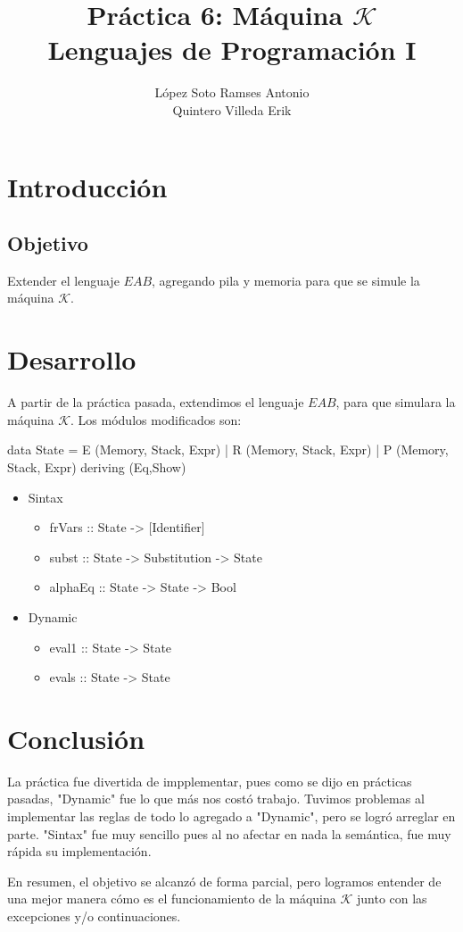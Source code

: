 \documentclass[12pt, letterpaper]{article}
\title{Práctica 6: Máquina $\mathcal{K}$ \\
       {\small Lenguajes de Programación I}}
\author{López Soto Ramses Antonio \\
        Quintero Villeda Erik}
\begin{document}
    \maketitle

    \section*{Introducción}

     \subsection*{Objetivo}
        Extender el lenguaje $EAB$, agregando pila y memoria para que se simule la máquina $\mathcal{K}$.

    \section*{Desarrollo}
    A partir de la práctica pasada, extendimos el lenguaje $EAB$, para que simulara la máquina $\mathcal{K}$.
    Los módulos modificados son:

    \begin{center}
        data State = E (Memory, Stack, Expr) | R (Memory, Stack, Expr) | P (Memory, Stack, Expr) deriving (Eq,Show)
    \end{center}

    \begin{itemize}
        \item Sintax
            \begin{itemize}
                \item frVars :: State -> [Identifier]
                \item subst :: State -> Substitution -> State
                \item alphaEq :: State -> State -> Bool
            \end{itemize}

        \item Dynamic
            \begin{itemize}
                \item eval1 :: State -> State
                \item evals :: State -> State
            \end{itemize}
    \end{itemize}

    \section*{Conclusión}
    La práctica fue divertida de impplementar, pues como se dijo en prácticas pasadas, "Dynamic" 
    fue lo que más nos costó trabajo. Tuvimos problemas al implementar las reglas de todo lo
    agregado a "Dynamic", pero se logró arreglar en parte. "Sintax" fue muy sencillo pues al no
    afectar en nada la semántica, fue muy rápida su implementación. \vspace{.3cm}

    En resumen, el objetivo se alcanzó de forma parcial, pero logramos entender de una mejor manera
    cómo es el funcionamiento de la máquina $\mathcal{K}$ junto con las excepciones y/o continuaciones.
\end{document}
